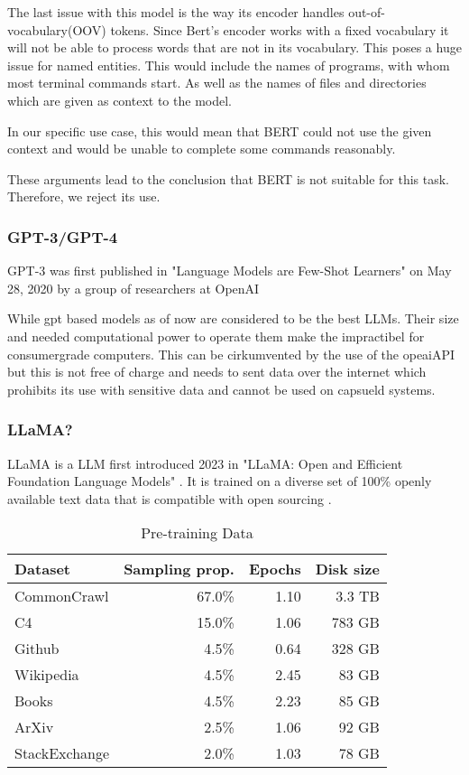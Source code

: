 The last issue with this model is the way its encoder handles out-of-vocabulary(OOV) tokens. Since Bert's encoder works with a fixed vocabulary it will not be able to process words that are not in its vocabulary. This poses a huge issue for named entities. This would include the names of programs, with whom most terminal commands start. As well as the names of files and directories which are given as context to the model. 

In our specific use case, this would mean that BERT could not use the given context and would be unable to complete some commands reasonably. 



These arguments lead to the conclusion that BERT is not suitable for this task. Therefore, we reject its use.





\subsubsection{GPT-3/GPT-4}

GPT-3 was first published in "Language Models are Few-Shot Learners" on May 28, 2020
by a group of researchers at OpenAI

While gpt based models as of now are considered to be the best LLMs. Their size and needed computational power to operate them make the impractibel for consumergrade computers. This can be cirkumvented by the use of the opeaiAPI but this is not free of charge and needs to sent data over the internet which prohibits its use with sensitive data and cannot be used on capsueld systems. 

\subsubsection{LLaMA?} 
LLaMA is a LLM first introduced 2023 in "LLaMA: Open and Efficient Foundation Language Models"\cite{touvron2023llama} . It is trained on a diverse set of  100\% openly available text data that is compatible with open sourcing\cite{touvron2023llama} .



\begin{table}[htbp]
\centering
\caption{Pre-training Data\cite{touvron2023llama}}
\begin{tabular}{|l|r|r|r|}
\hline
\textbf{Dataset} & \textbf{Sampling prop.} & \textbf{Epochs} & \textbf{Disk size} \\
\hline
CommonCrawl & 67.0\% & 1.10 & 3.3 TB \\
C4 & 15.0\% & 1.06 & 783 GB \\
Github & 4.5\% & 0.64 & 328 GB \\
Wikipedia & 4.5\% & 2.45 & 83 GB \\
Books & 4.5\% & 2.23 & 85 GB \\
ArXiv & 2.5\% & 1.06 & 92 GB \\
StackExchange & 2.0\% & 1.03 & 78 GB \\
\hline
\end{tabular}
\end{table}

